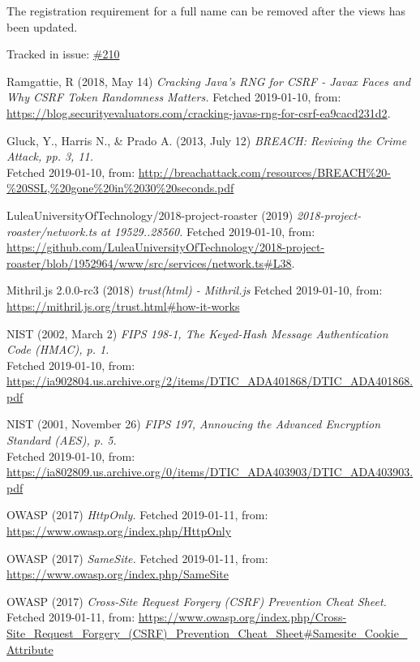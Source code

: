 \documentclass[12pt,a4paper]{report}
\begin{document}
The registration requirement for a full name can be removed after the views has been updated.

Tracked in issue: \href{https://github.com/LuleaUniversityOfTechnology/2018-project-roaster/issues/210}{\#210}

\newpage
\apptocmd{\sloppy}{\hbadness 10000\relax}{}{} 
{\RaggedRight\begin{thebibliography}{1}

Ramgattie, R (2018, May 14) {\em  Cracking Java’s RNG for CSRF - Javax Faces and Why CSRF Token Randomness Matters.}
Fetched 2019-01-10, from:
\url{https://blog.securityevaluators.com/cracking-javas-rng-for-csrf-ea9cacd231d2}.

Gluck, Y., Harris N., \& Prado A. (2013, July 12) {\em BREACH: Reviving the Crime Attack, pp. 3, 11.} \\
Fetched 2019-01-10, from:
\url{http://breachattack.com/resources/BREACH%20-%20SSL,%20gone%20in%2030%20seconds.pdf}

LuleaUniversityOfTechnology/2018-project-roaster (2019) {\em 2018-project-roaster/network.ts at 19529..28560.}
Fetched 2019-01-10, from:
\url{https://github.com/LuleaUniversityOfTechnology/2018-project-roaster/blob/1952964/www/src/services/network.ts#L38}.

Mithril.js 2.0.0-rc3 (2018) {\em trust(html) - Mithril.js}
Fetched 2019-01-10, from:
\url{https://mithril.js.org/trust.html#how-it-works}

NIST (2002, March 2) {\em FIPS 198-1, The Keyed-Hash Message Authentication Code (HMAC), p. 1.} \\
Fetched 2019-01-10, from:
\url{https://ia902804.us.archive.org/2/items/DTIC_ADA401868/DTIC_ADA401868.pdf}

NIST (2001, November 26) {\em FIPS 197, Annoucing the Advanced Encryption Standard (AES), p. 5.} \\
Fetched 2019-01-10, from:
\url{https://ia802809.us.archive.org/0/items/DTIC_ADA403903/DTIC_ADA403903.pdf}

OWASP (2017) {\em HttpOnly.} Fetched 2019-01-11, from:
\url{https://www.owasp.org/index.php/HttpOnly}

OWASP (2017) {\em SameSite.} Fetched 2019-01-11, from:
\url{https://www.owasp.org/index.php/SameSite}

OWASP (2017) {\em Cross-Site Request Forgery (CSRF) Prevention Cheat Sheet.} Fetched 2019-01-11, from:
\url{https://www.owasp.org/index.php/Cross-Site_Request_Forgery_(CSRF)_Prevention_Cheat_Sheet#Samesite_Cookie_Attribute}


\end{thebibliography}}
\end{document}
